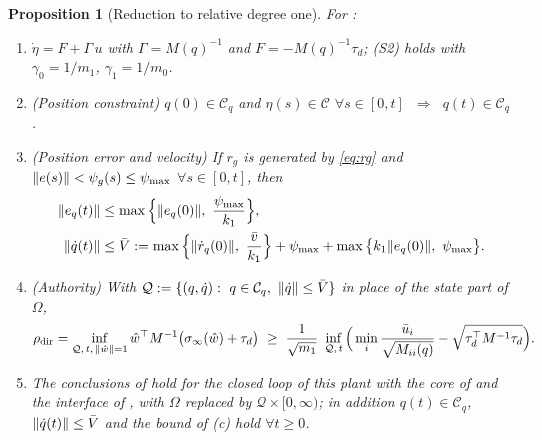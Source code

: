 \documentclass[11pt]{article}\usepackage[margin=1in]{geometry}\usepackage{amsmath,amssymb,amsthm,mathtools}\usepackage{graphicx}\graphicspath{{figures/}{../figures/}{figs/}{./}}\usepackage{enumitem}\usepackage{hyperref}\usepackage{cleveref}\usepackage{tikz}\usetikzlibrary{arrows.meta,positioning,calc,shapes.geometric}\usepackage{float}\usepackage[most]{tcolorbox}\usepackage{kotex}\usepackage{booktabs}\emergencystretch=1.6em\tolerance=2000 \crefname{assumption}{Assumption}{Assumptions}\Crefname{assumption}{Assumption}{Assumptions}\crefname{definition}{Definition}{Definitions}\Crefname{definition}{Definition}{Definitions}\crefname{proposition}{Proposition}{Propositions}\Crefname{proposition}{Proposition}{Propositions}\crefname{fact}{Fact}{Facts}\Crefname{fact}{Fact}{Facts} \newtheorem{assumption}{Assumption}\newtheorem{definition}{Definition}\newtheorem{lemma}{Lemma}\newtheorem{proposition}{Proposition}\newtheorem{theorem}{Theorem}\newtheorem{corollary}{Corollary}\newtheorem{fact}{Fact}\theoremstyle{remark}\newtheorem{remark}{Remark} \newcommand{\R}{\mathbb{R}}\newcommand{\U}{\mathcal U}
\newcommand{\Cset}{\mathcal C}\newcommand{\Pcl}{\mathcal P}\newcommand{\Zset}{\mathcal Z_0}\newcommand{\Xset}{\mathcal X_0}
\begin{document}
\begin{proposition}[Reduction to relative degree one]
\label{prop:mech}
For :
\begin{enumerate}[label=(\alph*)]
\item $\dot\eta=F+\Gamma\,u$ with $\Gamma=M(q)^{-1}$ and $F=-M(q)^{-1}\tau_d$; (S2) holds with $\gamma_0=1/m_1$, $\gamma_1=1/m_0$.
\item (Position constraint) $q(0)\in\Cset_q$ and $\eta(s)\in\Cset$ $\forall s\in[0,t]$ $\ \Rightarrow\ $ $q(t)\in\Cset_q$.
\item (Position error and velocity) If $r_g$ is generated by \eqref{eq:rg} and $\lVert e(s)\rVert<\psi_g(s)\le\psi_{\max}$ $\forall s\in[0,t]$, then
\begin{align*}
\norm{e_q(t)}&\le\max\Big\{\norm{e_q(0)},\ \frac{\psi_{\max}}{k_1}\Big\},\\
\norm{\dot q(t)}&\le\bar V:=\max\Big\{\norm{\dot r_q(0)},\ \frac{\bar v}{k_1}\Big\}+\psi_{\max}+\max\big\{k_1\norm{e_q(0)},\ \psi_{\max}\big\}.
\end{align*}
\item (Authority) With $\mathcal Q:=\{(q,\dot q):\ q\in\Cset_q,\ \norm{\dot q}\le\bar V\}$ in place of the state part of $\Omega$,
\[
\rho_{\mathrm{dir}}=\inf_{\mathcal Q,\,t,\,\norm{\what}=1}\what^\top M^{-1}\big(\sigma_\infty(\what)+\tau_d\big)\ \ge\ \frac{1}{\sqrt{m_1}}\ \inf_{\mathcal Q,\,t}\Big(\min_i\frac{\bar u_i}{\sqrt{M_{ii}(q)}}-\sqrt{\tau_d^\top M^{-1}\tau_d}\Big).
\]
\item The conclusions of  hold for the closed loop of this plant with the core of  and the interface of , with $\Omega$ replaced by $\mathcal Q\times[0,\infty)$; in addition $q(t)\in\Cset_q$, $\lVert \dot q(t)\rVert\le\bar V$ and the bound of (c) hold $\forall t\ge0$.
\end{enumerate}
\end{proposition}
\end{document}
